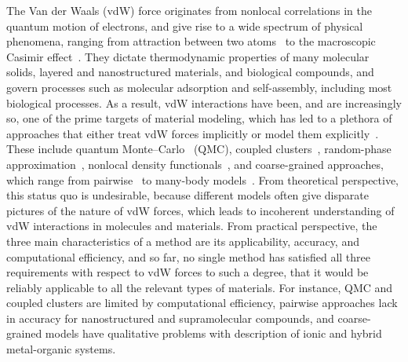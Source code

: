 The Van der Waals (vdW) force originates from nonlocal correlations in the quantum motion of electrons, and give rise to a wide spectrum of physical phenomena, ranging from attraction between two atoms~\citep{LondonZP30} to the macroscopic Casimir effect~\citep{JaffePRD05}.
They dictate thermodynamic properties of many molecular solids, layered and nanostructured materials, and biological compounds, and govern processes such as molecular adsorption and self-assembly, including most biological processes.
As a result, vdW interactions have been, and are increasingly so, one of the prime targets of material modeling, which has led to a plethora of approaches that either treat vdW forces implicitly or model them explicitly~\citep{KlimesJCP12,GrimmeCR16,HermannCR17}.
These include quantum Monte--Carlo~\citep{AmbrosettiJPCL14} (QMC), coupled clusters~\citep{YangS14}, random-phase approximation~\citep{LuPRL09}, nonlocal density functionals~\citep{DionPRL04,VydrovPRL09}, and coarse-grained approaches, which range from pairwise~\citep{GrimmeJCC04,BeckeJCP07,TkatchenkoPRL09} to many-body models~\citep{TkatchenkoPRL12,SilvestrelliJCP13}.
From theoretical perspective, this status quo is undesirable, because different models often give disparate pictures of the nature of vdW forces, which leads to incoherent understanding of vdW interactions in molecules and materials.
From practical perspective, the three main characteristics of a method are its applicability, accuracy, and computational efficiency, and so far, no single method has satisfied all three requirements with respect to vdW forces to such a degree, that it would be reliably applicable to all the relevant types of materials.
For instance, QMC and coupled clusters are limited by computational efficiency, pairwise approaches lack in accuracy for nanostructured and supramolecular compounds, and coarse-grained models have qualitative problems with description of ionic and hybrid metal-organic systems.

